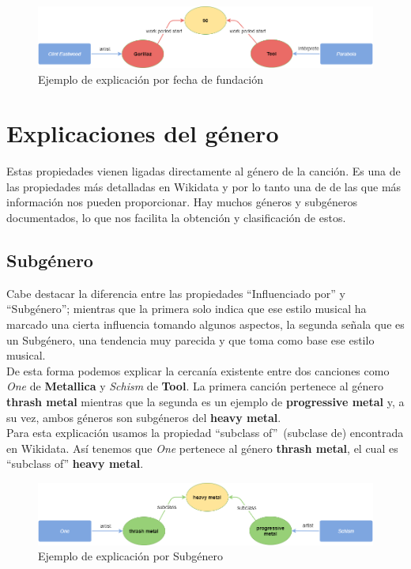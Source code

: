 \begin{figure}[h!]
	\centering
	\includegraphics[width = 1\textwidth]{Imagenes/Bitmap/Fundacion ejemplo.png}
	\caption{Ejemplo de explicación por fecha de fundación}
	\label{fig:sampleImage}
\end{figure}

\section{Explicaciones del género}

Estas propiedades vienen ligadas directamente al género de la canción. Es una de las propiedades más detalladas en Wikidata y por lo tanto una de de las que más información nos pueden proporcionar. Hay muchos géneros y subgéneros documentados, lo que nos facilita la obtención y clasificación de estos.\\

\subsection*{Subgénero}

Cabe destacar la diferencia entre las propiedades ``Influenciado por'' y ``Subgénero''; mientras que la primera solo indica que ese estilo musical ha marcado una cierta influencia tomando algunos aspectos, la segunda señala que es un Subgénero, una tendencia muy parecida y que toma como base ese estilo musical.\\

De esta forma podemos explicar la cercanía existente entre dos canciones como \textit{One} de \textbf{Metallica} y \textit{Schism} de \textbf{Tool}. La primera canción pertenece al género \textbf{thrash metal} mientras que la segunda es un ejemplo de \textbf{progressive metal} y, a su vez, ambos géneros son subgéneros del \textbf{heavy metal}.\\

Para esta explicación usamos la propiedad ``subclass of''~(subclase de) encontrada en Wikidata. Así tenemos que \textit{One} pertenece al género \textbf{thrash metal}, el cual es ``subclass of'' \textbf{heavy metal}.\\

\begin{figure}[h!]
	\centering
	\includegraphics[width = 1\textwidth]{Imagenes/Bitmap/Subgenre.png}
	\caption{Ejemplo de explicación por Subgénero}
	\label{fig:sampleImage}
\end{figure}

